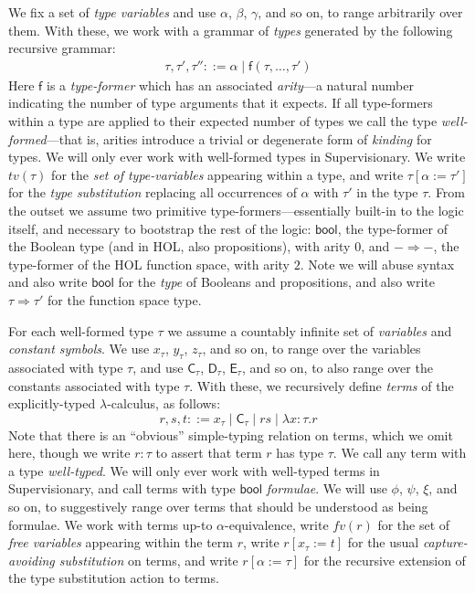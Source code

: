 \documentclass[a4paper, UKenglish, cleveref, autoref, thm-restate]{lipics-v2021}
\newcommand{\lam}[1]{\lambda{#1}.}
\begin{document}
We fix a set of \emph{type variables} and use $\alpha$, $\beta$, $\gamma$, and so on, to range arbitrarily over them.
With these, we work with a grammar of \emph{types} generated by the following recursive grammar:
\begin{gather*}
\tau, \tau', \tau'' ::= \alpha \mid \mathsf{f}(\tau, \ldots, \tau')
\end{gather*}
Here $\mathsf{f}$ is a \emph{type-former} which has an associated \emph{arity}---a natural number indicating the number of type arguments that it expects.
If all type-formers within a type are applied to their expected number of types we call the type \emph{well-formed}---that is, arities introduce a trivial or degenerate form of \emph{kinding} for types.
We will only ever work with well-formed types in Supervisionary.
We write $tv(\tau)$ for the \emph{set of type-variables} appearing within a type, and write $\tau[\alpha := \tau']$ for the \emph{type substitution} replacing all occurrences of $\alpha$ with $\tau'$ in the type $\tau$.
From the outset we assume two primitive type-formers---essentially built-in to the logic itself, and necessary to bootstrap the rest of the logic: $\mathsf{bool}$, the type-former of the Boolean type (and in HOL, also propositions), with arity $0$, and $- \Rightarrow -$, the type-former of the HOL function space, with arity $2$.
Note we will abuse syntax and also write $\mathsf{bool}$ for the \emph{type} of Booleans and propositions, and also write $\tau \Rightarrow \tau'$ for the function space type.

For each well-formed type $\tau$ we assume a countably infinite set of \emph{variables} and \emph{constant symbols}.
We use $x_\tau$, $y_\tau$, $z_\tau$, and so on, to range over the variables associated with type $\tau$, and use $\mathsf{C}_\tau$, $\mathsf{D}_\tau$, $\mathsf{E}_\tau$, and so on, to also range over the constants associated with type $\tau$.
With these, we recursively define \emph{terms} of the explicitly-typed $\lambda$-calculus, as follows:
\begin{displaymath}
r, s, t ::= x_\tau \mid \mathsf{C}_\tau \mid rs \mid \lam{x{:}\tau}r
\end{displaymath}
Note that there is an ``obvious'' simple-typing relation on terms, which we omit here, though we write $r : \tau$ to assert that term $r$ has type $\tau$.
We call any term with a type \emph{well-typed}.
We will only ever work with well-typed terms in Supervisionary, and call terms with type $\mathsf{bool}$ \emph{formulae}.
We will use $\phi$, $\psi$, $\xi$, and so on, to suggestively range over terms that should be understood as being formulae.
We work with terms up-to $\alpha$-equivalence, write $fv(r)$ for the set of \emph{free variables} appearing within the term $r$, write $r[x_\tau := t]$ for the usual \emph{capture-avoiding substitution} on terms, and write $r[\alpha := \tau]$ for the recursive extension of the type substitution action to terms.
\end{document}
